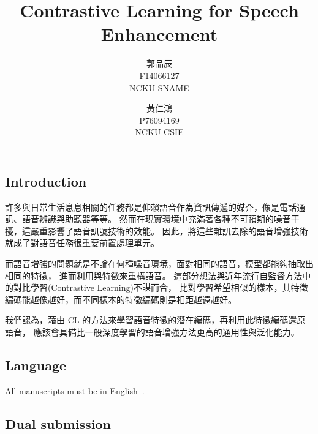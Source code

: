 \documentclass[10pt,twocolumn,letterpaper]{article}
\begin{document}
\begin{CJK}{UTF8}{bkai}
   \title{Contrastive Learning for Speech Enhancement}

   \author{
      郭品辰\\
      F14066127\\
      NCKU SNAME
      \and
      黃仁鴻\\
      P76094169\\
      NCKU CSIE
   }

   \maketitle

   \begin{abstract}

   \end{abstract}

   \section{Introduction}

   許多與日常生活息息相關的任務都是仰賴語音作為資訊傳遞的媒介，像是電話通訊、語音辨識與助聽器等等。
   然而在現實環境中充滿著各種不可預期的噪音干擾，這嚴重影響了語音訊號技術的效能。
   因此，將這些雜訊去除的語音增強技術就成了對語音任務很重要前置處理單元。~\cite{Alpher04}

   而語音增強的問題就是不論在何種噪音環境，面對相同的語音，模型都能夠抽取出相同的特徵，
   進而利用與特徵來重構語音。
   這部分想法與近年流行自監督方法中的對比學習(Contrastive Learning)不謀而合，
   比對學習希望相似的樣本，其特徵編碼能越像越好，而不同樣本的特徵編碼則是相距越遠越好。

   我們認為，藉由 CL 的方法來學習語音特徵的潛在編碼，再利用此特徵編碼還原語音，
   應該會具備比一般深度學習的語音增強方法更高的通用性與泛化能力。
   \subsection{Language}

   All manuscripts must be in English~\cite{Authors14}.

   \subsection{Dual submission}


\end{CJK}
\end{document}

